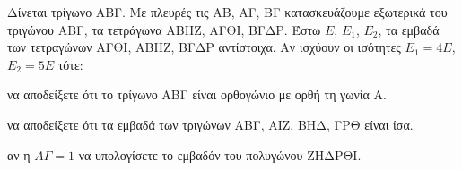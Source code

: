 Δίνεται τρίγωνο ΑΒΓ. Με πλευρές τις ΑΒ, ΑΓ, ΒΓ κατασκευάζουμε εξωτερικά του τριγώνου ΑΒΓ, τα τετράγωνα ΑΒΗΖ, ΑΓΘΙ, ΒΓΔΡ. Έστω $E$, $E_1$, $E_2$, τα εμβαδά των τετραγώνων ΑΓΘΙ, ΑΒΗΖ, ΒΓΔΡ αντίστοιχα. Αν ισχύουν οι ισότητες $E_1 = 4E$, $E_2 = 5E$ τότε:
\begin{alist}
    \item να αποδείξετε ότι το τρίγωνο ΑΒΓ είναι ορθογώνιο με ορθή τη γωνία A. 
    \item να αποδείξετε ότι τα εμβαδά των τριγώνων ΑΒΓ, ΑΙΖ, ΒΗΔ, ΓΡΘ είναι ίσα. 
    \item αν η $A\Gamma=1$ να υπολογίσετε το εμβαδόν του πολυγώνου ΖΗΔΡΘΙ. 
\end{alist}